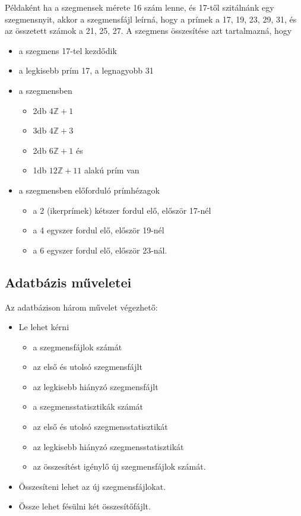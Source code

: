 Példaként ha a szegmensek mérete 16 szám lenne, és 17-től szitálnánk egy szegmensnyit, akkor a szegmensfájl leírná, hogy a prímek a 17, 19, 23, 29, 31, és az összetett számok a 21, 25, 27.
A szegmens összesítése azt tartalmazná, hogy
\begin{itemize}
\item a szegmens 17-tel kezdődik
\item a legkisebb prím 17, a legnagyobb 31
\item a szegmensben
\begin{itemize}
\item 2db $4\mathbb{Z}+1$
\item 3db $4\mathbb{Z}+3$
\item 2db $6\mathbb{Z}+1$ és		
\item 1db $12\mathbb{Z}+11$ alakú prím van
\end{itemize}
\item a szegmensben előforduló prímhézagok
\begin{itemize}
\item a 2 (ikerprímek) kétszer fordul elő, először 17-nél
\item a 4 egyszer fordul elő, először 19-nél
\item a 6 egyszer fordul elő, először 23-nál.
\end{itemize}
\end{itemize}

\subsection{Adatbázis műveletei}

Az adatbázison három művelet végezhető:
\begin{itemize}

\item Le lehet kérni
\begin{itemize}
\item a szegmensfájlok számát
\item az első és utolsó szegmensfájlt
\item az legkisebb hiányzó szegmensfájlt
\item a szegmensstatisztikák számát
\item az első és utolsó szegmensstatisztikát
\item az legkisebb hiányzó szegmensstatisztikát
\item az összesítést igénylő új szegmensfájlok számát.
\end{itemize}

\item Összesíteni lehet az új szegmensfájlokat.

\item Össze lehet fésülni két összesítőfájlt.

\end{itemize}

